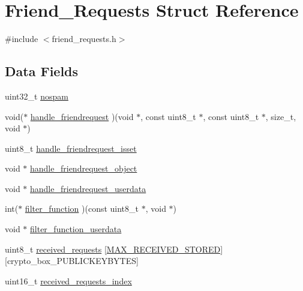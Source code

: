 \hypertarget{struct_friend___requests}{\section{Friend\+\_\+\+Requests Struct Reference}
\label{struct_friend___requests}
}


{\ttfamily \#include $<$friend\+\_\+requests.\+h$>$}

\subsection*{Data Fields}
\begin{DoxyCompactItemize}
\item 
uint32\+\_\+t \hyperlink{struct_friend___requests_a637ab08069536895c9a896c4ee9dcdf7}{nospam}
\item 
void($\ast$ \hyperlink{struct_friend___requests_a9d869a78e35e2af8312a3bec21dc7d0c}{handle\+\_\+friendrequest} )(void $\ast$, const uint8\+\_\+t $\ast$, const uint8\+\_\+t $\ast$, size\+\_\+t, void $\ast$)
\item 
uint8\+\_\+t \hyperlink{struct_friend___requests_aef7d18a109ced43f4cb3069083a91e69}{handle\+\_\+friendrequest\+\_\+isset}
\item 
void $\ast$ \hyperlink{struct_friend___requests_a21949251a7cb2ba8e6e3f973c8fdd01c}{handle\+\_\+friendrequest\+\_\+object}
\item 
void $\ast$ \hyperlink{struct_friend___requests_a59dcbf63199ca147db439e5ade631a81}{handle\+\_\+friendrequest\+\_\+userdata}
\item 
int($\ast$ \hyperlink{struct_friend___requests_a09cd55683f2075e72518e94efbcba2d5}{filter\+\_\+function} )(const uint8\+\_\+t $\ast$, void $\ast$)
\item 
void $\ast$ \hyperlink{struct_friend___requests_a52b17bf891c29cd0309d69ddf5be7e5e}{filter\+\_\+function\+\_\+userdata}
\item 
uint8\+\_\+t \hyperlink{struct_friend___requests_a68ddfbf4a697f40962f07c5608f394cf}{received\+\_\+requests} \mbox{[}\hyperlink{friend__requests_8h_adad74320175e7fbddd37ceecc6385b8a}{M\+A\+X\+\_\+\+R\+E\+C\+E\+I\+V\+E\+D\+\_\+\+S\+T\+O\+R\+E\+D}\mbox{]}\mbox{[}crypto\+\_\+box\+\_\+\+P\+U\+B\+L\+I\+C\+K\+E\+Y\+B\+Y\+T\+E\+S\mbox{]}
\item 
uint16\+\_\+t \hyperlink{struct_friend___requests_a0e318c112b35d57bd44f5a47b9e3f680}{received\+\_\+requests\+\_\+index}
\end{DoxyCompactItemize}


